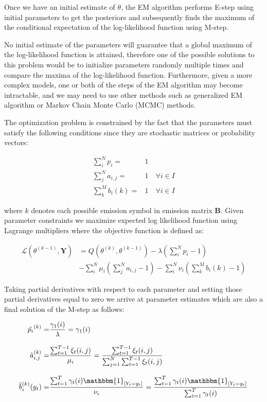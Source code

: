 Once we have an initial estimate of $\theta$, the EM algorithm performs E-step using initial parameters to get the posteriors and 
subsequently finds the maximum of the conditional expectation of the log-likelihood function using M-step. 

No initial estimate of the parameters will guarantee that a global maximum of the log-likelihood function is attained, therefore one of the possible
solutions to this problem would be to initialize parameters randomly multiple times and compare the maxima of the log-likelihood function. Furthermore, 
given a more complex models, one or both of the steps of the EM algorithm may become intractable, and we may need to use other methods such as
generalized EM algorithm or Markov Chain Monte Carlo (MCMC) methods. \citep{Bishop2006}

The optimization problem is constrained by the fact that the parameters must satisfy the following conditions 
since they are stochastic matrices or probability vectors:

\begin{align}
\sum_i^N p_i =& 1 \\
\sum_j^N a_{i,j} =& 1 \quad  \forall i \in I \\
\sum_k^M b_{i}(k) =& 1 \quad \forall i \in I
\end{align}

where $k$ denotes each possible emission symbol in emission matrix $\textbf{B}$. Given parameter constraints we maximize 
expected log likelihood function using Lagrange multipliers where the objective function is defined as:

\begin{align}
\mathcal{L}(\theta^{(k-1)},\textbf{Y}) &= Q(\theta^{(k)}, \theta^{(k-1)}) - \lambda(\sum_i^N p_i - 1) \\ \nonumber
& - \sum_i^N \mu_i (\sum_j^N a_{i,j} -  1)  - \sum_i^N \nu_i (\sum_k^M b_{i}(k) - 1)
\end{align}

 Taking partial derivatives with respect to each parameter and setting those partial derivatives equal to zero we arrive at 
 parameter estimates which are also a final solution of the M-step as follows:

\begin{align}
\hat{p_i}^{(k)} = & \frac{\gamma_1(i)}{\lambda} = \gamma_1(i) \\[0.3cm]
\hat{a}_{i,j}^{(k)} = & \frac{\sum_{t=1}^{T-1} \xi_t (i,j)}{\mu_i} = \frac{\sum_{t=1}^{T-1} \xi_t (i,j)}{\sum_{j=1}^{N} \sum_{t=1}^{T-1} \xi_t (i,j)} \\[0.3cm]
\hat{b}_{i}^{(k)}(y_t) = & \frac{\sum_{t=1}^{T} \gamma_t (i) \mathbbm{1}_{[Y_t = y_t ]}}{\nu_i} = \frac{ \sum_{t=1}^{T} \gamma_t (i) \mathbbm{1}_{[Y_t = y_t ]}}{\sum_{t=1}^{T} \gamma_t (i)} 
\end{align}

